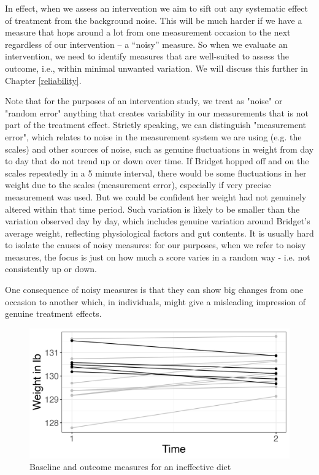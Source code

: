 \documentclass{krantz}
\begin{document}
In effect, when we assess an intervention we aim to sift out any systematic effect of treatment from the background noise. This will be much harder if we have a measure that hops around a lot from one measurement occasion to the next regardless of our intervention -- a ``noisy'' measure. So when we evaluate an intervention, we need to identify measures that are well-suited to assess the outcome, i.e., within minimal unwanted variation. We will discuss this further in Chapter \ref{reliability}.

\begin{tcolorbox}[colback=Black!5!lightgray,colframe=black!75!black,coltitle=white,title=More on random error]
Note that for the purposes of an intervention study, we treat as "noise" or "random error" anything that creates variability in our measurements that is not part of the treatment effect. Strictly speaking, we can distinguish "measurement error", which relates to noise in the measurement system we are using (e.g. the scales) and other sources of noise, such as genuine fluctuations in weight from day to day that do not trend up or down over time. If Bridget hopped off and on the scales repeatedly in a 5 minute interval, there would be some fluctuations in her weight due to the scales (measurement error), especially if very precise measurement was used. But we could be confident her weight had not genuinely altered within that time period. Such variation is likely to be smaller than the variation observed day by day, which includes genuine variation around Bridget's average weight, reflecting physiological factors and gut contents. It is usually hard to isolate the causes of noisy measures: for our purposes, when we refer to noisy measures, the focus is just on how much a score varies in a random way - i.e. not consistently up or down.
\end{tcolorbox}

One consequence of noisy measures is that they can show big changes from one occasion to another which, in individuals, might give a misleading impression of genuine treatment effects.

\begin{figure}
\includegraphics[width=0.75\linewidth]{images_bw/weightplot2} \caption{Baseline and outcome measures for an ineffective diet}\label{fig:weightplot2}
\end{figure}
\end{document}
